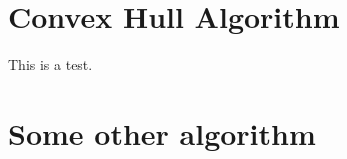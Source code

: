 \documentclass[letterpaper]{article}
\begin{document}
\begin{multicols}{2}
    \vline
    \tableofcontents
\end{multicols}

\section{Convex Hull Algorithm}
This is a test.

\clearpage

\section{Some other algorithm}
%
\printindex
\end{document}
